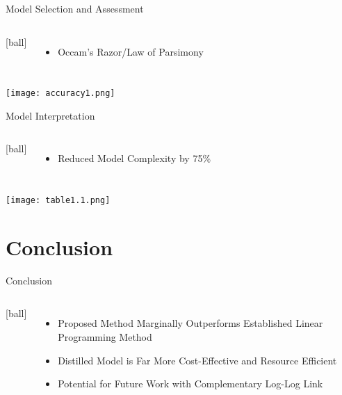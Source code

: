 \documentclass[12pt]{beamer}
\begin{document}
\begin{frame}{Model Selection and Assessment}

\begin{columns}
[ball]
  \begin{itemize}
  \item Occam's Razor/Law of Parsimony
  \end{itemize}
  \end{columns}


\begin{center}
\texttt{[image: accuracy1.png]}
\end{center}


\end{frame}


\begin{frame}{Model Interpretation}

\begin{columns}
[ball]
  \begin{itemize}
  \item Reduced Model Complexity by 75\%
  \end{itemize}
  \end{columns}


\begin{center}
\texttt{[image: table1.1.png]}
\end{center}

\end{frame}







\section{Conclusion}

\begin{frame}{Conclusion}

\begin{columns}
[ball]
  \begin{itemize}
  \item Proposed Method Marginally Outperforms Established Linear Programming Method
  \item Distilled Model is Far More Cost-Effective and Resource Efficient
  \item Potential for Future Work with Complementary Log-Log Link
 \end{itemize}
\end{columns}

\end{frame}

\end{document}
